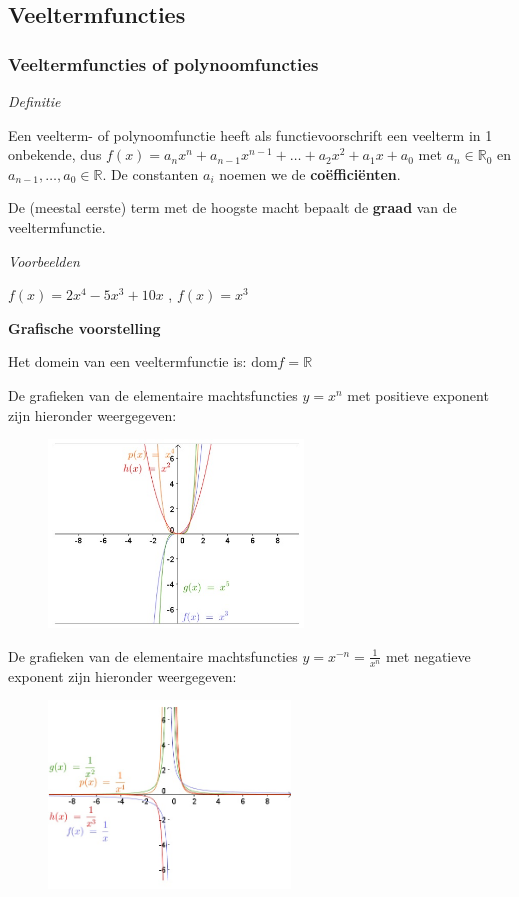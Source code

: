 \subsection{Veeltermfuncties}

\subsubsection{Veeltermfuncties of polynoomfuncties}

\emph{Definitie}

Een veelterm- of polynoomfunctie heeft als functievoorschrift een veelterm in 1 onbekende, dus
$f(x)=a_{n}x^{n}+a_{n-1}x^{n-1}+\ldots+a_{2}x^{2}+a_{1}x+a_{0}$
met $a_{n}\in\mathbb{R}_{0}$ en $a_{n-1},\ldots,a_{0}\in\mathbb{R}$. De constanten $a_{i}$ noemen we de \textbf{co\"effici\"enten}.

De (meestal eerste) term met de hoogste macht bepaalt de \textbf{graad} van de veeltermfunctie.

\emph{Voorbeelden}

$f(x)=2x^{4}-5x^{3}+10x$ , $f(x)=x^{3}$ 

\textbf{Grafische voorstelling}

\noindent Het domein van een veeltermfunctie is: $\textrm{dom}f=\mathbb{R}$

\noindent De grafieken van de elementaire machtsfuncties $y=x^{n}$
met positieve exponent zijn hieronder weergegeven:

\begin{figure}[h]
\centering{}\includegraphics[height=5cm]{2_elem_rekenvaardigheden_B/inputs/veeltermfuncties1.jpg} 
\end{figure}


\noindent De grafieken van de elementaire machtsfuncties $y=x^{-n}=\frac{1}{x^{n}}$
met negatieve exponent zijn hieronder weergegeven:

\begin{figure}[h]
\centering{}\includegraphics[height=5cm]{2_elem_rekenvaardigheden_B/inputs/veeltermfuncties2.jpg} 
\end{figure}


